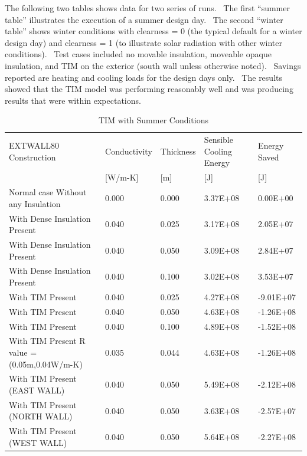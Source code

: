 The following two tables shows data for two series of runs.~ The first ``summer table'' illustrates the execution of a summer design day.~ The second ``winter table'' shows winter conditions with clearness = 0 (the typical default for a winter design day) and clearness = 1 (to illustrate solar radiation with other winter conditions).~ Test cases included no movable insulation, moveable opaque insulation, and TIM on the exterior (south wall unless otherwise noted).~ Savings reported are heating and cooling loads for the design days only.~ The results showed that the TIM model was performing reasonably well and was producing results that were within expectations.

\begin{longtable}[c]{p{3.0in}p{0.75in}p{0.75in}p{0.75in}p{0.75in}}
\caption{  TIM with Summer Conditions \label{table:tim-with-summer-conditions}}\\
\toprule 
EXTWALL80 Construction & Conductivity & Thickness & Sensible Cooling Energy & Energy Saved \tabularnewline
~ & [W/m-K] & [m] & [J] & [J] \tabularnewline
\midrule
\endhead
Normal case Without any Insulation & 0.000 & 0.000 & 3.37E+08 & 0.00E+00 \tabularnewline
With Dense Insulation Present & 0.040 & 0.025 & 3.17E+08 & 2.05E+07 \tabularnewline
With Dense Insulation Present & 0.040 & 0.050 & 3.09E+08 & 2.84E+07 \tabularnewline
With Dense Insulation Present & 0.040 & 0.100 & 3.02E+08 & 3.53E+07 \tabularnewline
With TIM Present & 0.040 & 0.025 & 4.27E+08 & -9.01E+07 \tabularnewline
With TIM Present & 0.040 & 0.050 & 4.63E+08 & -1.26E+08 \tabularnewline
With TIM Present & 0.040 & 0.100 & 4.89E+08 & -1.52E+08 \tabularnewline
With TIM Present R value = (0.05m,0.04W/m-K) & 0.035 & 0.044 & 4.63E+08 & -1.26E+08 \tabularnewline
With TIM Present (EAST WALL) & 0.040 & 0.050 & 5.49E+08 & -2.12E+08 \tabularnewline
With TIM Present (NORTH WALL) & 0.040 & 0.050 & 3.63E+08 & -2.57E+07 \tabularnewline
With TIM Present (WEST WALL) & 0.040 & 0.050 & 5.64E+08 & -2.27E+08 \tabularnewline
\bottomrule
\end{longtable}

